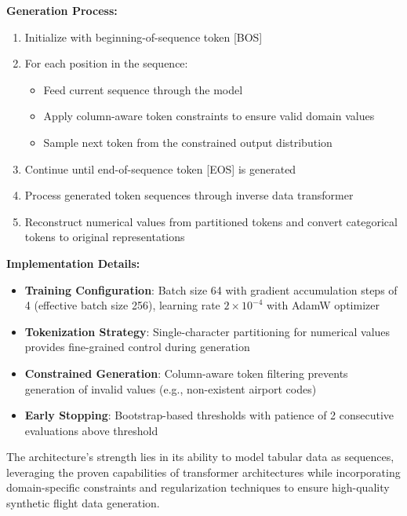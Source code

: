 \documentclass[conference]{IEEEtran}
\begin{document}
\textbf{Generation Process:}
\begin{enumerate}
    \item Initialize with beginning-of-sequence token [BOS]
    \item For each position in the sequence:
    \begin{itemize}
        \item Feed current sequence through the model
        \item Apply column-aware token constraints to ensure valid domain values
        \item Sample next token from the constrained output distribution
    \end{itemize}
    \item Continue until end-of-sequence token [EOS] is generated
    \item Process generated token sequences through inverse data transformer
    \item Reconstruct numerical values from partitioned tokens and convert categorical tokens to original representations
\end{enumerate}

\textbf{Implementation Details:}
\begin{itemize}
    \item \textbf{Training Configuration}: Batch size 64 with gradient accumulation steps of 4 (effective batch size 256), learning rate $2 \times 10^{-4}$ with AdamW optimizer
    \item \textbf{Tokenization Strategy}: Single-character partitioning for numerical values provides fine-grained control during generation
    \item \textbf{Constrained Generation}: Column-aware token filtering prevents generation of invalid values (e.g., non-existent airport codes)
    \item \textbf{Early Stopping}: Bootstrap-based thresholds with patience of 2 consecutive evaluations above threshold
\end{itemize}

The architecture's strength lies in its ability to model tabular data as sequences, leveraging the proven capabilities of transformer architectures while incorporating domain-specific constraints and regularization techniques to ensure high-quality synthetic flight data generation.
\end{document}

